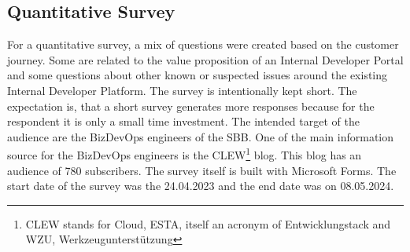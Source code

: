 \documentclass[a4paper,12pt]{article}
\begin{document}
    \subsection{Quantitative Survey}
    \label{subsec:quansur}
    For a quantitative survey, a mix of questions were created based on the customer journey.
    Some are related to the value proposition of an Internal Developer Portal and some questions about other known or
    suspected issues around the existing Internal Developer Platform.
    The survey is intentionally kept short.
    The expectation is, that a short survey generates more responses because for the respondent it is only a small time investment.
    The intended target of the audience are the BizDevOps engineers of the SBB.
    One of the main information source for the BizDevOps engineers is the CLEW\footnote{CLEW stands for Cloud, ESTA,
        itself an acronym of Entwicklungstack and WZU, Werkzeugunterstützung} blog.
    This blog has an audience of 780 subscribers.
    The survey itself is built with Microsoft Forms.
    The start date of the survey was the 24.04.2023 and the end date was on 08.05.2024.
\end{document}
